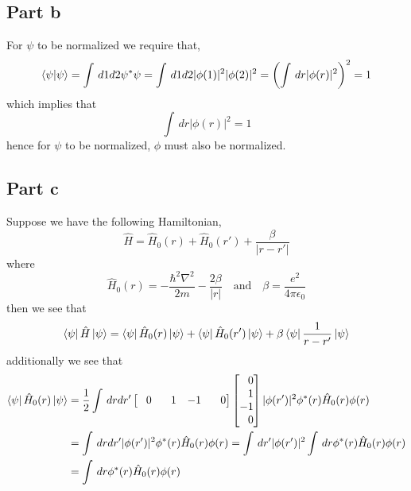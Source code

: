 \documentclass[12pt]{report}
\theoremstyle{custom}
\begin{document}
\subsection*{Part b}
For $\psi$ to be normalized we require that,
\begin{align*}
\braket{\psi|\psi} = \int \,d1 d2 \psi^*\psi = \int \, d1 d2 |\phi(1)|^2 |\phi(2)|^2 = \left(\int \, dr |\phi(r)|^2\right)^2 = 1
\end{align*}
which implies that
\begin{equation*}
\int \, dr |\phi(r)|^2 = 1
\end{equation*}
hence for $\psi$ to be normalized, $\phi$ must also be normalized.

\subsection*{Part c}
Suppose we have the following Hamiltonian,
\begin{equation*}
\hat{H} = \hat{H}_0(r) + \hat{H}_0(r') + \frac{\beta}{|r - r'|}
\end{equation*}
where
\begin{equation*}
    \hat{H}_0(r) = -\frac{\hbar^2 \nabla^2}{2m} - \frac{2\beta}{|r|} \quad \text{and} \quad \beta = \frac{e^2}{4\pi \epsilon_0} 
\end{equation*}
then we see that 
\begin{equation*}
    \bra{\psi}\hat{H}\ket{\psi} = \bra{\psi}\hat{H}_0(r) \ket{\psi} + \bra{\psi}\hat{H}_0(r') \ket{\psi} + \beta \bra{\psi} \frac{1}{r-r'} \ket{\psi}
\end{equation*}
additionally we see that
\begin{align*}
    \bra{\psi} \hat{H}_0(r) \ket{\psi} &= \frac{1}{2}\int \, dr dr'\begin{bmatrix}
    \phantom{-}0 & \phantom{-}1 & -1 & \phantom{-}0
  \end{bmatrix}\begin{bmatrix}
    \phantom{-}0 \\ \phantom{-}1 \\ -1 \\ \phantom{-}0
  \end{bmatrix} |\phi(r')|^2 \phi^*(r) \hat{H}_0(r) \phi(r) \\
  &= \int \, dr dr' |\phi(r')|^2 \phi^*(r) \hat{H}_0(r) \phi(r) = \int \, dr' |\phi(r')|^2 \int \, dr \phi^*(r) \hat{H}_0(r) \phi(r)\\
  &= \int \, dr \phi^*(r) \hat{H}_0(r) \phi(r)
\end{align*}
\end{document}
